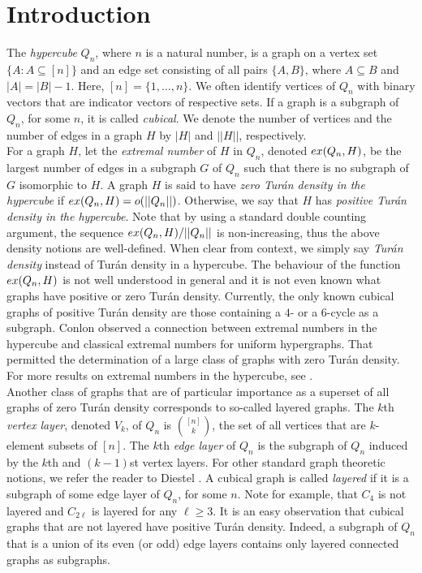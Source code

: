 \documentclass[11pt, a4paper]{article}
\newcommand{\ex}{{\rm  ex}}
\begin{document}
	
	
	
	\section{Introduction}
	The {\it hypercube} $Q_n$, where $n$ is a natural number, is a graph on  a vertex set $\{A: A\subseteq [n]\}$ and an edge set consisting of all pairs $\{A,B\}$, where $A\subseteq B$ and $|A|=|B|-1$. Here, $[n]= \{1, \ldots, n\}$. We often identify vertices of $Q_n$ with binary vectors that are indicator vectors of respective sets.  If a graph is a subgraph of $Q_n$, for some $n$, it is called {\it cubical}. We denote the number of vertices and the number of edges in a graph $H$ by  $|H|$ and $||H||$, respectively. \\
	
For a graph $H$, let the {\it extremal number}  of $H$ in $Q_n$, denoted 	$\ex(Q_n, H)$,  be the largest number of edges in a subgraph $G$ of  $Q_n$ such that there is no subgraph of $G$ isomorphic to $H$. 
A graph $H$ is said to have {\it zero Tur\'an density in the hypercube} if $\ex(Q_n, H) = o(||Q_n||)$. Otherwise, we say that $H$ has  {\it positive Tur\'an density in the hypercube}. Note that by using a standard double counting argument,  the sequence $\ex(Q_n, H)/||Q_n||$ is non-increasing, thus the above density notions are well-defined. When clear from context, we simply  say {\it Tur\'an density}  instead of Tur\'an density in a hypercube. 
The behaviour of the function $\ex(Q_n, H)$ is not well understood in general and it is not even known what graphs have positive or zero Tur\'an density.
Currently, the only known cubical graphs of positive Tur\'an density are those containing a $4$- or a $6$-cycle as a subgraph.
Conlon \cite{C} observed a connection between extremal numbers in the hypercube and classical extremal numbers for uniform hypergraphs. That permitted the determination of a large class of  graphs with zero Tur\'an density. For more results on extremal numbers in the hypercube, see  \cite{baber, balogh, AKS, ARSV, AM,TW, O}.\\



Another class of graphs that are of particular importance as a superset of all graphs of zero Tur\'an density corresponds to  so-called layered graphs. The $k$th {\it vertex layer}, denoted $V_k$,  of $Q_n$ is $\binom{[n]}{k}$, the set of all vertices that are $k$-element subsets of $[n]$. The $k$th {\it edge layer} of $Q_n$ is the subgraph of $Q_n$ induced by the $k$th and $(k-1)$st vertex layers.  For other standard graph theoretic notions, we refer the reader to Diestel \cite{D}. 
 A cubical graph is called {\it layered} if it is a subgraph of some edge layer of $Q_n$, for some $n$.  Note for example, that $C_4$ is not layered and $C_{2\ell}$  is layered for  any $\ell\geq 3$. It is an easy observation that cubical graphs that are not layered have positive Tur\'an density. Indeed,  a subgraph of $Q_n$ that is a union of its even (or odd) edge layers contains only layered connected graphs as subgraphs.   \\
\end{document}
